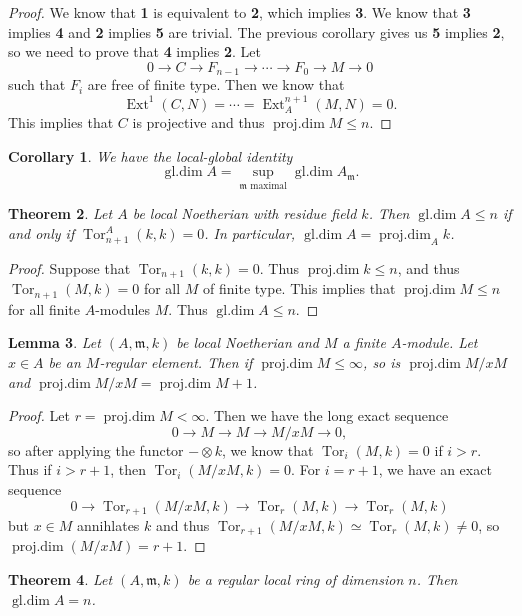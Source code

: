 \documentclass[leqno, openany]{memoir}
\newtheorem{thm}{Theorem}[section]
\newtheorem{cor}[thm]{Corollary}
\newtheorem{lem}[thm]{Lemma}
\theoremstyle{definition}
\theoremstyle{remark}
\theoremstyle{plain}
\theoremstyle{definition}
\theoremstyle{remark}
\newcommand{\mf}[1]{\mathfrak{#1}}
\DeclareMathOperator{\Ext}{Ext}
\DeclareMathOperator{\Tor}{Tor}
\DeclareMathOperator{\pdim}{proj.dim}
\DeclareMathOperator{\gdim}{gl.dim}
\begin{document}
\begin{proof}
    We know that \textbf{1} is equivalent to \textbf{2}, which implies \textbf{3}. We know that \textbf{3} implies \textbf{4} and \textbf{2} implies \textbf{5} are trivial. The previous corollary gives us \textbf{5} implies \textbf{2}, so we need to prove that \textbf{4} implies \textbf{2}. Let
    \[ 0 \to C \to F_{n-1} \to \cdots \to F_0 \to M \to 0 \]
    such that $F_i$ are free of finite type. Then we know that
    \[ \Ext^1(C, N) = \cdots = \Ext_A^{n+1}(M,N) = 0. \]
    This implies that $C$ is projective and thus $\pdim M \leq n$.
\end{proof}

\begin{cor}
    We have the local-global identity
    \[ \gdim A = \sup_{\mf{m} \text{ maximal}} \gdim A_{\mf{m}}. \]
\end{cor}

\begin{thm}
    Let $A$ be local Noetherian with residue field $k$. Then $\gdim A \leq n$ if and only if $\Tor_{n+1}^A(k,k) = 0$. In particular, $\gdim A = \pdim_A k$.
\end{thm}

\begin{proof}
    Suppose that $\Tor_{n+1}(k,k) = 0$. Thus $\pdim k \leq n$, and thus $\Tor_{n+1}(M, k) = 0$ for all $M$ of finite type. This implies that $\pdim M \leq n$ for all finite $A$-modules $M$. Thus $\gdim A \leq n$.
\end{proof}

\begin{lem}
    Let $(A, \mf{m}, k)$ be local Noetherian and $M$ a finite $A$-module. Let $x \in A$ be an $M$-regular element. Then if $\pdim M \leq \infty$, so is $\pdim M/xM$ and $\pdim M/xM = \pdim M + 1$.
\end{lem}

\begin{proof}
    Let $r = \pdim M < \infty$. Then we have the long exact sequence
    \[ 0 \to M \to M \to M/xM \to 0, \]
    so after applying the functor $- \otimes k$, we know that $\Tor_i(M,k) = 0$ if $i > r$. Thus if $i > r+1$, then $\Tor_i(M/xM, k) = 0$. For $i = r+1$, we have an exact sequence
    \[ 0 \to \Tor_{r+1}(M/xM, k) \to \Tor_r(M,k) \to \Tor_r(M,k) \]
    but $x \in M$ annihlates $k$ and thus $\Tor_{r+1}(M/xM, k) \simeq \Tor_r(M,k) \neq 0$, so $\pdim(M/xM) = r+1$.
\end{proof}

\begin{thm}
    Let $(A,\mf{m}, k)$ be a regular local ring of dimension $n$. Then $\gdim A = n$.
\end{thm}
\end{document}
